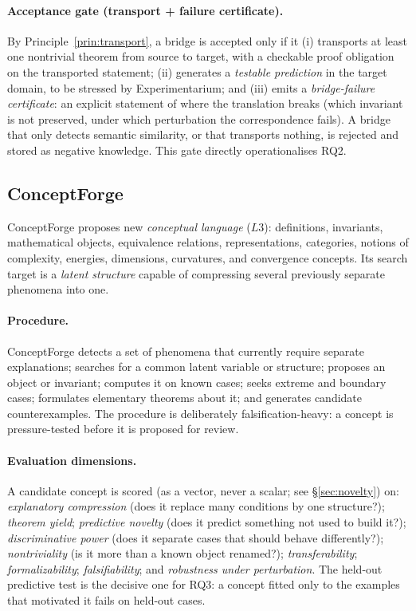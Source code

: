 \documentclass[11pt]{article}
\theoremstyle{definition}
\theoremstyle{remark}
\begin{document}
\paragraph{Acceptance gate (transport + failure certificate).} By Principle~\ref{prin:transport}, a
bridge is accepted only if it (i) transports at least one nontrivial theorem from source to target,
with a checkable proof obligation on the transported statement; (ii) generates a \emph{testable
prediction} in the target domain, to be stressed by Experimentarium; and (iii) emits a
\emph{bridge-failure certificate}: an explicit statement of where the translation breaks (which
invariant is not preserved, under which perturbation the correspondence fails). A bridge that only
detects semantic similarity, or that transports nothing, is rejected and stored as negative
knowledge. This gate directly operationalises RQ2.

\subsection{ConceptForge}
\label{sec:conceptforge}

ConceptForge proposes new \emph{conceptual language} ($L3$): definitions, invariants, mathematical
objects, equivalence relations, representations, categories, notions of complexity, energies,
dimensions, curvatures, and convergence concepts. Its search target is a \emph{latent structure}
capable of compressing several previously separate phenomena into one.

\paragraph{Procedure.} ConceptForge detects a set of phenomena that currently require separate
explanations; searches for a common latent variable or structure; proposes an object or invariant;
computes it on known cases; seeks extreme and boundary cases; formulates elementary theorems about
it; and generates candidate counterexamples. The procedure is deliberately falsification-heavy: a
concept is pressure-tested before it is proposed for review.

\paragraph{Evaluation dimensions.} A candidate concept is scored (as a vector, never a scalar; see
\S\ref{sec:novelty}) on: \emph{explanatory compression} (does it replace many conditions by one
structure?); \emph{theorem yield}; \emph{predictive novelty} (does it predict something not used to
build it?); \emph{discriminative power} (does it separate cases that should behave differently?);
\emph{nontriviality} (is it more than a known object renamed?); \emph{transferability};
\emph{formalizability}; \emph{falsifiability}; and \emph{robustness under perturbation}. The
held-out predictive test is the decisive one for RQ3: a concept fitted only to the examples that
motivated it fails on held-out cases.
\end{document}
